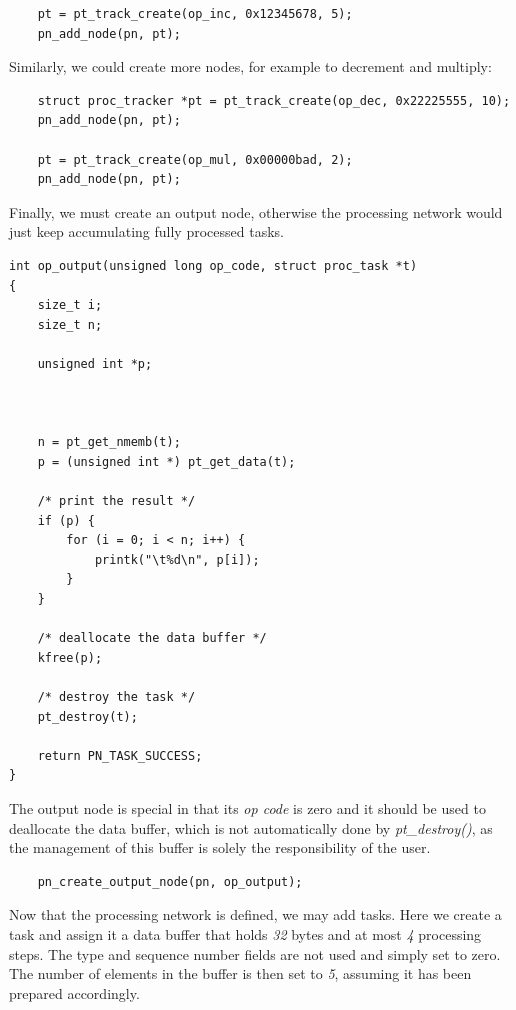 \begin{lstlisting}
	pt = pt_track_create(op_inc, 0x12345678, 5);
	pn_add_node(pn, pt);
\end{lstlisting}

\noindent
Similarly, we could create more nodes, for example to decrement and multiply:

\begin{lstlisting}
	struct proc_tracker *pt = pt_track_create(op_dec, 0x22225555, 10);
	pn_add_node(pn, pt);

	pt = pt_track_create(op_mul, 0x00000bad, 2);
	pn_add_node(pn, pt);
\end{lstlisting}

\noindent
Finally, we must create an output node, otherwise the processing network
would just keep accumulating fully processed tasks.

\begin{minipage}{\linewidth}
\begin{lstlisting}
int op_output(unsigned long op_code, struct proc_task *t)
{
	size_t i;
	size_t n;

	unsigned int *p;



	n = pt_get_nmemb(t);
	p = (unsigned int *) pt_get_data(t);

	/* print the result */
	if (p) {
		for (i = 0; i < n; i++) {
			printk("\t%d\n", p[i]);
		}
	}

	/* deallocate the data buffer */
	kfree(p);

	/* destroy the task */
	pt_destroy(t);

	return PN_TASK_SUCCESS;
}
\end{lstlisting}
\end{minipage}

\noindent
The output node is special in that its \emph{op code} is zero and it should 
be used to deallocate the data buffer, which is not automatically done by
\emph{pt\_destroy()}, as the management of this buffer is solely the
responsibility of the user.


\begin{lstlisting}
	pn_create_output_node(pn, op_output);
\end{lstlisting}

\noindent Now that the processing network is defined, we may add tasks. Here we
create a task and assign it  a data buffer that holds \emph{32} bytes and at
most \emph{4} processing steps. The type and sequence number fields are not
used and simply set to zero. The number of elements in the buffer is then set
to \emph{5}, assuming it has been prepared accordingly.

